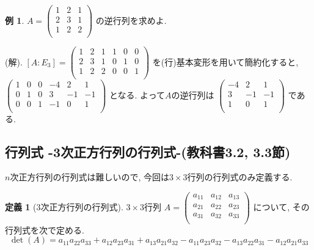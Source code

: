 \documentclass[dvipdfmx,a4paper,11pt]{article}
\theoremstyle{definition}
\newtheorem{dfn}[thm]{定義}
\newtheorem{exa}[thm]{例}
\begin{document}
 \begin{exa}
 $
  A=\begin{pmatrix}
 1& 2&1 \\
 2& 3 & 1 \\
 1& 2 &  2 \\
 \end{pmatrix} 
 $
 の逆行列を求めよ.
 
 (解).
 $[A:E_3] = 
 \begin{pmatrix}
 1& 2&1  &1& 0&0 \\
 2& 3 & 1 &0& 1&0 \\
 1& 2 &  2 &0& 0&1 \\
 \end{pmatrix} 
 $
 を(行)基本変形を用いて簡約化すると, \\
 $
 \begin{pmatrix}
 1& 0&0  &-4& 2&1 \\
 0& 1 & 0 &3& -1&-1 \\
 0& 0&  1 &-1& 0&1 \\
 \end{pmatrix} 
 $
 となる. よって$A$の逆行列は
 $
 \begin{pmatrix}
-4& 2&1 \\
3& -1&-1\\
1& 0&1 \\
 \end{pmatrix} 
 $
 である.
 \end{exa}


 \subsection{行列式 -3次正方行列の行列式-(教科書3.2, 3.3節)}
 \label{subsec-7-2}
$n$次正方行列の行列式は難しいので, 今回は$3 \times 3$行列の行列式のみ定義する.

 \begin{tcolorbox}[
    colback = white,
    colframe = green!35!black,
    fonttitle = \bfseries,
    breakable = true]
    \begin{dfn}[3次正方行列の行列式]
$3 \times 3$行列
$A = 
  \begin{pmatrix}
a_{11}& a_{12} & a_{13}\\
a_{21}& a_{22} & a_{23}\\
a_{31}& a_{32} & a_{33}\\
 \end{pmatrix} 
$
について, その行列式を次で定める. 
$$
 \det(A)= 
 a_{11}a_{22}a_{33}+ a_{12}a_{23}a_{31}  +  a_{13}a_{21}a_{32} 
- a_{11}a_{23}a_{32}     - a_{13}a_{22}a_{31}  - a_{12}a_{21}a_{33}
$$
  \end{dfn}
 \end{tcolorbox}
\end{document}
